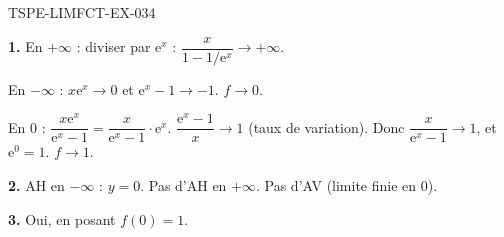 \begin{corrige}{TSPE-LIMFCT-EX-034}

\textbf{1.} En $+\infty$ : diviser par $\mathrm{e}^x$ : $\dfrac{x}{1-1/\mathrm{e}^x} \to +\infty$.

En $-\infty$ : $x\mathrm{e}^x \to 0$ et $\mathrm{e}^x-1 \to -1$. $f \to 0$.

En $0$ : $\dfrac{x\mathrm{e}^x}{\mathrm{e}^x-1} = \dfrac{x}{\mathrm{e}^x-1} \cdot \mathrm{e}^x$. $\dfrac{\mathrm{e}^x-1}{x} \to 1$ (taux de variation). Donc $\dfrac{x}{\mathrm{e}^x-1} \to 1$, et $\mathrm{e}^0 = 1$. $f \to 1$.

\textbf{2.} AH en $-\infty$ : $y = 0$. Pas d'AH en $+\infty$. Pas d'AV (limite finie en $0$).

\textbf{3.} Oui, en posant $f(0) = 1$.

\end{corrige}
